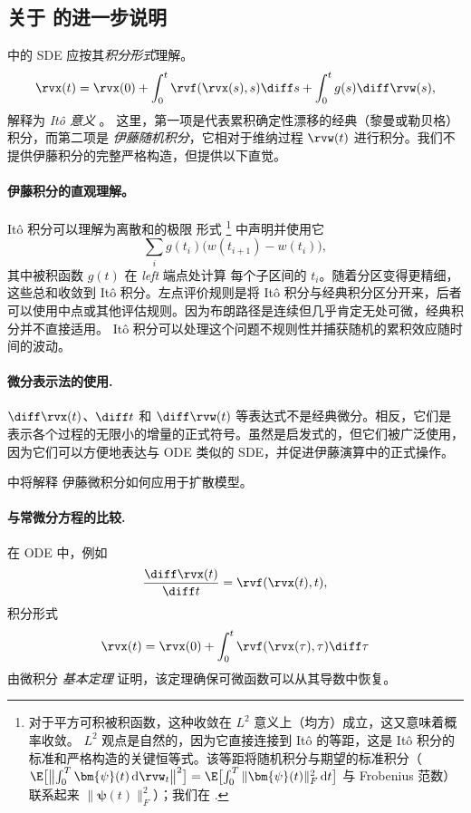 \subsection{关于  的进一步说明}
 中的 SDE 应按其\emph{积分形式}理解。
\begin{align}\label{eq:sde-integral-form}
    \rvx(t) = \rvx(0) + \int_0^t \rvf(\rvx(s), s) \diff s + \int_0^t g(s) \diff \rvw(s),
\end{align}
解释为 \emph{Itô 意义 }。
这里，第一项是代表累积确定性漂移的经典（黎曼或勒贝格）积分，而第二项是 \emph{伊藤随机积分}，它相对于维纳过程 $ \rvw(t) $ 进行积分。我们不提供伊藤积分的完整严格构造，但提供以下直觉。\paragraph{伊藤积分的直观理解。}
It\^o 积分可以理解为离散和的极限
形式 \footnote{ 对于平方可积被积函数，这种收敛在 $L^2$ 意义上（均方）成立，这又意味着概率收敛。 $L^2$ 观点是自然的，因为它直接连接到 It\^o 的等距，这是 It\^o 积分的标准和严格构造的关键恒等式。该等距将随机积分与期望的标准积分（$\E\bigl[\bigl\|\int_0^T \bm{\psi}(t)\,\mathrm{d}\rvw_t \bigr\|^2\bigr] = \E\bigl[\int_0^T \|\bm{\psi}(t)\|_F^2\,\mathrm{d}t\bigr]$ 与 Frobenius 范数）联系起来
$\|\bm{\psi}(t)\|_F^2$）；我们在 .} 中声明并使用它
\[
\sum_i g(t_i)\bigl(w(t_{i+1})-w(t_i)\bigr),
\]
其中被积函数 $g(t)$ 在 \emph{left} 端点处计算
每个子区间的 $t_i$。随着分区变得更精细，这些总和收敛到 It\^o 积分。左点评价规则是将 It\^o 积分与经典积分区分开来，后者可以使用中点或其他评估规则。因为布朗路径是连续但几乎肯定无处可微，经典积分并不直接适用。 It\^o 积分可以处理这个问题不规则性并捕获随机的累积效应随时间的波动。

\paragraph{微分表示法的使用.}
$ \diff \rvx(t) $、$ \diff t $ 和 $ \diff \rvw(t) $ 等表达式不是经典微分。相反，它们是表示各个过程的无限小的增量的正式符号。虽然是启发式的，但它们被广泛使用，因为它们可以方便地表达与 ODE 类似的 SDE，并促进伊藤演算中的正式操作。

 中将解释 伊藤微积分如何应用于扩散模型。


\paragraph{与常微分方程的比较.}
在 ODE 中，例如
\[
\frac{\diff \rvx(t)}{\diff t} = \rvf(\rvx(t), t),
\]
积分形式
\[
\rvx(t) = \rvx(0) + \int_0^t \rvf(\rvx(\tau), \tau) \diff \tau
\]
由微积分 \emph{ 基本定理 } 证明，该定理确保可微函数可以从其导数中恢复。

